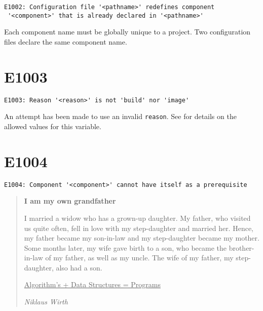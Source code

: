 \begin{footnotesize}
\begin{verbatim}
E1002: Configuration file '<pathname>' redefines component
 '<component>' that is already declared in '<pathname>'
\end{verbatim}
\end{footnotesize}

Each component name must be globally unique to a project.  Two
configuration files declare the same component name.

\section{E1003}

\begin{footnotesize}
\begin{verbatim}
E1003: Reason '<reason>' is not 'build' nor 'image'
\end{verbatim}
\end{footnotesize}

An attempt has been made to use an invalid \texttt{reason}.  See
 for details on the allowed values for this
variable.

\section{E1004}

\begin{footnotesize}
\begin{verbatim}
E1004: Component '<component>' cannot have itself as a prerequisite
\end{verbatim}
\end{footnotesize}

\begin{quote}
  \textbf{I am my own grandfather}

  I married a widow who has a grown-up daughter.  My father, who
  visited us quite often, fell in love with my step-daughter and
  married her.  Hence, my father became my son-in-law and my
  step-daughter became my mother.  Some months later, my wife gave
  birth to a son, who became the brother-in-law of my father, as well
  as my uncle. The wife of my father, my step-daughter, also had a
  son.

  \underline{Algorithm's + Data Structures = Programs}

  \emph{Niklaus Wirth}
\end{quote}

